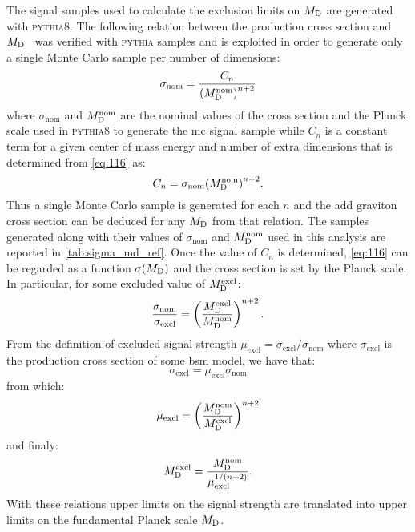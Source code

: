 The signal samples used to calculate the exclusion limits on $M_\mathrm{D}$ are generated
with \textsc{pythia8}. The following relation between the production cross
section and $M_\mathrm{D}$~\cite{ADDPhenomenology} was verified with \textsc{pythia}
samples and is exploited in order to generate only a single Monte Carlo sample
per number of dimensions:
\begin{equation}
  \label{eq:116}
  \sigma_\mathrm{nom} = \frac{C_n}{{(M_\mathrm{D}^\mathrm{nom})}^{n + 2}}
\end{equation}
where $\sigma_\mathrm{nom}$ and $M_\mathrm{D}^\mathrm{nom}$ are the nominal values of the
cross section and the Planck scale used in \textsc{pythia8} to generate the
\gls{mc} signal sample while $C_n$ is a constant term for a given center of mass
energy and number of extra dimensions that is determined from \cref{eq:116} as:
\begin{equation}
  \label{eq:179}
  C_n = \sigma_\mathrm{nom} {(M_\mathrm{D}^\mathrm{nom})}^{n + 2}.
\end{equation}
Thus a single Monte Carlo sample is generated for each $n$ and the \gls{add}
graviton cross section can be deduced for any $M_\mathrm{D}$ from that relation. The
samples generated along with their values of $\sigma_\mathrm{nom}$ and
$M_\mathrm{D}^\mathrm{nom}$ used in this analysis are reported in
\cref{tab:sigma_md_ref}. Once the value of $C_n$ is determined, \cref{eq:116}
can be regarded as a function $\sigma(M_\mathrm{D})$ and the cross section is set by the
Planck scale. In particular, for some excluded value of $M_\mathrm{D}^\mathrm{excl}$:
\begin{equation}
  \label{eq:180}
  \frac{\sigma_\mathrm{nom}}{\sigma_\mathrm{excl}} = \left(
    \frac{M_\mathrm{D}^\mathrm{excl}}{M_\mathrm{D}^\mathrm{nom}} \right)^{n + 2}.
\end{equation}
From the definition of excluded signal strength
$\mu_\mathrm{excl} = \sigma_\mathrm{excl}/\sigma_\mathrm{nom}$ where
$\sigma_\mathrm{excl}$ is the production cross section of some \gls{bsm} model,
we have that:
\begin{equation}
  \label{eq:181}
  \sigma_\mathrm{excl} = \mu_\mathrm{excl} \sigma_\mathrm{nom}
\end{equation}
from which:
\begin{equation}
  \label{eq:182}
  \mu_\mathrm{excl} = \left( \frac{M_\mathrm{D}^\mathrm{nom}}{M_\mathrm{D}^\mathrm{excl}}
  \right)^{n + 2}
\end{equation}
and finaly:
\begin{equation}
  \label{eq:117}
  M_\mathrm{D}^\mathrm{excl} = \frac{M_\mathrm{D}^\mathrm{nom}}{\mu^{1/(n + 2)}_\mathrm{excl}}.
\end{equation}
With these relations upper limits on the signal strength are translated into
upper limits on the fundamental Planck scale $M_\mathrm{D}$.

